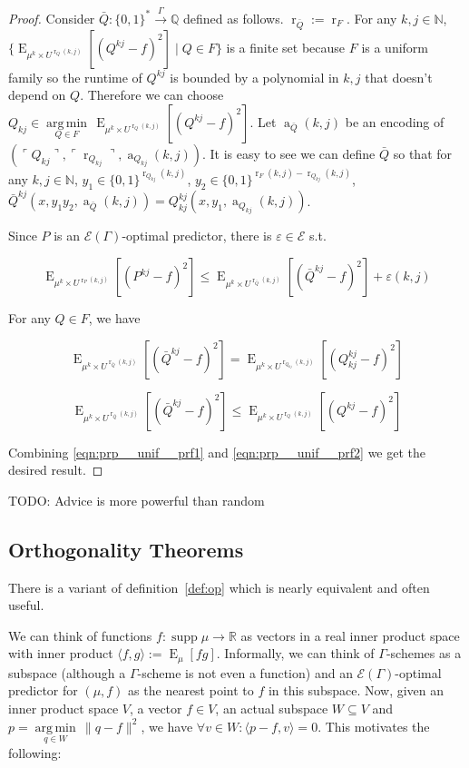\documentclass{article}
\theoremstyle{definition}
\theoremstyle{plain}
\newcommand{\Words}{{\{ 0, 1 \}^*}}
\newcommand{\WordsLen}[1]{{\{ 0, 1 \}^{#1}}}
\DeclareMathOperator{\Supp}{supp}
\DeclareMathOperator{\E}{E}
\DeclareMathOperator{\R}{r}
\DeclareMathOperator{\A}{a}
\newcommand{\Argmin}[1]{\underset{#1}{\operatorname{arg\,min}}\,}
\newcommand{\Nats}{\mathbb{N}}
\newcommand{\Rats}{\mathbb{Q}}
\newcommand{\Reals}{\mathbb{R}}
\newcommand{\Norm}[1]{\lVert #1 \rVert}
\newcommand{\Chev}[1]{\langle #1 \rangle}
\newcommand{\Quote}[1]{\ulcorner #1 \urcorner}
\begin{document}
\begin{proof}

Consider $\bar{Q}: \Words \xrightarrow{\Gamma} \Rats$ defined as follows. $\R_{\bar{Q}}:=\R_F$. For any $k,j \in \Nats$, $\{\E_{\mu^k \times U^{\R_Q(k,j)}}[(Q^{kj} - f)^2] \mid Q \in F\}$ is a finite set because $F$ is a uniform family so the runtime of $Q^{kj}$ is bounded by a polynomial in $k,j$ that doesn't depend on $Q$. Therefore we can choose $Q_{kj} \in \Argmin{Q \in F} \E_{\mu^k \times U^{\R_Q(k,j)}}[(Q^{kj} - f)^2]$. Let $\A_{\bar{Q}}(k,j)$ be an encoding of $(\Quote{Q_{kj}},\Quote{\R_{Q_{kj}}},\A_{Q_{kj}}(k,j))$. It is easy to see we can define $\bar{Q}$ so that for any $k,j \in \Nats$, $y_1 \in \WordsLen{\R_{Q_{kj}}(k,j)}$, $y_2 \in \WordsLen{\R_F(k,j)-\R_{Q_{kj}}(k,j)}$, $\bar{Q}^{kj}(x,y_1 y_2,\A_{\bar{Q}}(k,j))=Q_{kj}^{kj}(x,y_1,\A_{Q_{kj}}(k,j))$.

Since $P$ is an $\mathcal{E}(\Gamma)$-optimal predictor, there is $\varepsilon \in \mathcal{E}$ s.t.

\begin{equation}
\label{eqn:prp__unif__prf1}
\E_{\mu^k \times U^{\R_P(k,j)}}[(P^{kj} - f)^2] \leq \E_{\mu^k \times U^{\R_{\bar{Q}}(k,j)}}[(\bar{Q}^{kj} - f)^2] + \varepsilon(k,j)
\end{equation}

For any $Q \in F$, we have 

$$\E_{\mu^k \times U^{\R_{\bar{Q}}(k,j)}}[(\bar{Q}^{kj} - f)^2]=\E_{\mu^k \times U^{\R_{Q_{kj}}(k,j)}}[(Q_{kj}^{kj} - f)^2]$$

\begin{equation}
\label{eqn:prp__unif__prf2}
\E_{\mu^k \times U^{\R_{\bar{Q}}(k,j)}}[(\bar{Q}^{kj} - f)^2] \leq \E_{\mu^k \times U^{\R_Q(k,j)}}[(Q^{kj} - f)^2]
\end{equation}

Combining \ref{eqn:prp__unif__prf1} and \ref{eqn:prp__unif__prf2} we get the desired result.

\end{proof}

TODO: Advice is more powerful than random

\subsection{Orthogonality Theorems}

There is a variant of definition~\ref{def:op} which is nearly equivalent and often useful. 

We can think of functions $f: \Supp \mu \rightarrow \Reals$ as vectors in a real inner product space with inner product $\Chev{f,g}:=\E_\mu[fg]$. Informally, we can think of $\Gamma$-schemes as a subspace (although a $\Gamma$-scheme is not even a function) and an $\mathcal{E}(\Gamma)$-optimal predictor for $(\mu,f)$ as the nearest point to $f$ in this subspace. Now, given an inner product space $V$, a vector $f \in V$, an actual subspace $W \subseteq V$ and $p = \Argmin{q \in W} \Norm{q - f}^2$, we have $\forall v \in W: \Chev{p-f,v}=0$. This motivates the following:
\end{document}
